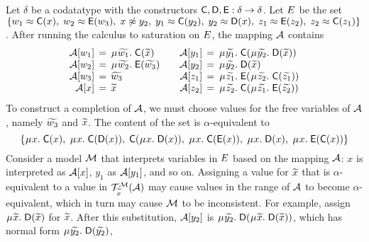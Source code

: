 \begin{examplex}
Let $\delta$ be a codatatype with the constructors $\textsf{C}, \textsf{D}, \textsf{E} :\delta \rightarrow \delta$.
Let $E$ be the set
$\{
w_1 \approx \textsf{C}( x ),\;
w_2 \approx \textsf{E}( w_3 ),\;
x \not\approx y_2,\;
y_1 \approx \textsf{C}( y_2 ),\;
y_2 \approx \textsf{D}( x ),\;
z_1 \approx \textsf{E}( z_2 ),\;
z_2 \approx \textsf{C}( z_1 )
\}$.
After running the calculus to saturation on $E$, the mapping $\mathcal{A}$ contains
\[\begin{array}{r@{}c@{}l@{\;}l@{\qquad}r@{}c@{}r@{\;}l@{}l@{\;}l}
\Val \ec{w_1} & {}\,=\,{} & \MU {\Varec{w_1}}. & \const{C}( {\Varec{x}} ) &
\Val \ec{y_1} & {}\,=\,{} & \MU {\Varec{y_1}}. & \const{C}( & \MU {\Varec{y_2}}. & \const{D}( {\Varec{x}} ) ) \\
\Val \ec{w_2} & = & \MU {\Varec{w_2}}. & \const{E}( {\Varec{w_3}} ) &
\Val \ec{y_2} & = & \MU {\Varec{y_2}}. & \multicolumn{2}{@{}l@{}}{\const{D}( {\Varec{x}} )} \\
\Val \ec{w_3} & = & {\Varec{w_3}} &&
\Val \ec{z_1} & = & \MU {\Varec{z_1}}. & \const{E}( & \MU {\Varec{z_2}}. & \const{C}( {\Varec{z_1}} ) ) \\
\Val \ec{x} & = & {\Varec{x}} &&
\Val \ec{z_2} & = & \MU {\Varec{z_2}}. & \const{C}( & \MU {\Varec{z_1}}. & \const{E}( {\Varec{z_2}} ) )
\end{array}\]
%
To construct a completion of $\mathcal{A}$, we must choose values for the free variables of $\mathcal{A}$,
namely ${\widetilde{w_3}}$ and ${\widetilde{x}}$.
The content of the set  is $\alpha$-equivalent to
\[%
\{
\MU x.\; \const{C}( x ),\;
\MU x.\; \const{C}( \const{D}( x )),\;
\const{C}( \MU x.\; \const{D}( x )),\;
\MU x.\; \const{C}( \const{E}( x )),\;
\MU x.\; \const{D}( x ),\;
\MU x.\; \const{E}( \const{C}( x ))
\}
\]
Consider a model $\mathcal{M}$ that interprets variables in $E$ based on the mapping $\mathcal{A}$:
$x$ is interpreted as $\mathcal{A} [x]$, $y_1$ as $\mathcal{A} [y_1]$, and so on.
Assigning a value for ${\widetilde{x}}$ that is $\alpha$-equivalent to a value in $\mathcal{T}^{\mathcal{M}}_{{\widetilde{x}}}( \mathcal{A} )$
may cause values in the range of $\mathcal{A}$ to become $\alpha$-equivalent,
which in turn may cause $\mathcal{M}$ to be inconsistent.
For example, assign $\MU {\Varec{x}}.\; \const{D}( {\Varec{x}} )$ for ${\widetilde{x}}$.
After this substitution, $\mathcal{A} [y_2]$ is $\MU {\Varec{y_2}}.\; \const{D}( \MU {\Varec{x}}.\; \const{D}( {\Varec{x}} ) )$,
which has normal form $\MU {\Varec{y_2}}.\; \const{D}( {\Varec{y_2}} )$,

\end{examplex}

